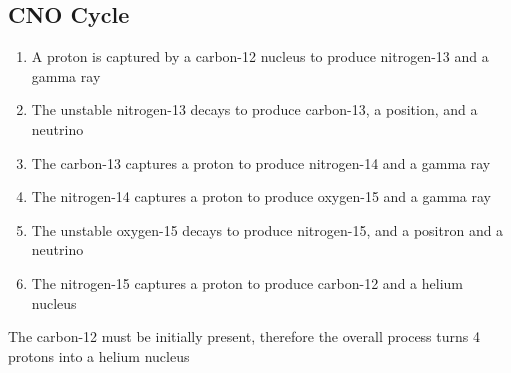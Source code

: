 	\subsection{CNO Cycle}
	
		\begin{enumerate}
			\item A proton is captured by a carbon-12 nucleus to produce nitrogen-13 and a gamma ray
			\item The unstable nitrogen-13 decays to produce carbon-13, a position, and a neutrino
			\item The carbon-13 captures a proton to produce nitrogen-14 and a gamma ray
			\item The nitrogen-14 captures a proton to produce oxygen-15 and a gamma ray
			\item The unstable oxygen-15 decays to produce nitrogen-15, and a positron and a neutrino
			\item The nitrogen-15 captures a proton to produce carbon-12 and a helium nucleus
		\end{enumerate}

		The carbon-12 must be initially present, therefore the overall process turns 4 protons into a helium nucleus
